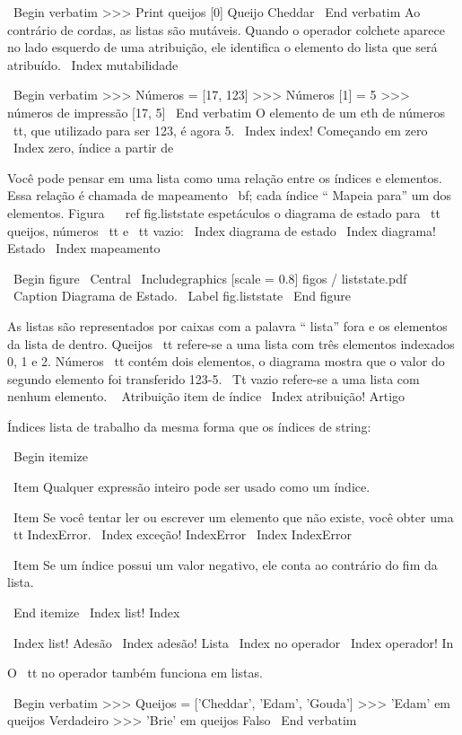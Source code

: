 \documentclass[10pt]{book}
\begin{document}
{{{{{{\ Begin {verbatim}
>>> Print queijos [0]
Queijo Cheddar
\ End {verbatim}
%
Ao contrário de cordas, as listas são mutáveis. Quando o operador colchete aparece
no lado esquerdo de uma atribuição, ele identifica o elemento do
lista que será atribuído.
\ Index {} mutabilidade

\ Begin {verbatim}
>>> Números = [17, 123]
>>> Números [1] = 5
>>> números de impressão
[17, 5]
\ End {verbatim}
%
O elemento de um eth de números {\ tt}, que
utilizado para ser 123, é agora 5.
\ Index {index! Começando em zero}
\ Index {zero, índice a partir de}

Você pode pensar em uma lista como uma relação entre os índices e
elementos. Essa relação é chamada de mapeamento {\ bf}; cada índice
`` Mapeia para'' um dos elementos. Figura ~ \ ref {} fig.liststate espetáculos
o diagrama de estado para {\ tt
queijos}, {números \ tt} e {\ tt vazio}:
\ Index {diagrama de estado}
\ Index {diagrama! Estado}
\ Index {mapeamento}

\ Begin {figure}
\ Central
{\ Includegraphics [scale = 0.8] {figos / liststate.pdf}}
\ Caption {Diagrama de Estado.}
\ Label {} fig.liststate
\ End {figure}

As listas são representados por caixas com a palavra `` lista'' fora
e os elementos da lista de dentro. {Queijos \ tt} refere-se a
uma lista com três elementos indexados 0, 1 e 2.
{Números \ tt} contém dois elementos, o diagrama mostra que o
valor do segundo elemento foi transferido 123-5.
{\ Tt vazio} refere-se a uma lista com nenhum elemento.
\ {} Atribuição item de índice
\ Index {atribuição! Artigo}

Índices lista de trabalho da mesma forma que os índices de string:

\ Begin {itemize}

\ Item Qualquer expressão inteiro pode ser usado como um índice.

\ Item Se você tentar ler ou escrever um elemento que não existe, você
obter uma {\ tt IndexError}.
\ Index {exceção! IndexError}
\ Index {} IndexError

\ Item Se um índice possui um valor negativo, ele conta ao contrário do
fim da lista.

\ End {itemize}
\ Index {list! Index}

\ Index {list! Adesão}
\ Index {adesão! Lista}
\ Index {} no operador
\ Index {operador! In}

O {\ tt no} operador também funciona em listas.

\ Begin {verbatim}
>>> Queijos = ['Cheddar', 'Edam', 'Gouda']
>>> 'Edam' em queijos
Verdadeiro
>>> 'Brie' em queijos
Falso
\ End {verbatim}


}}}}}}
\end{document}
